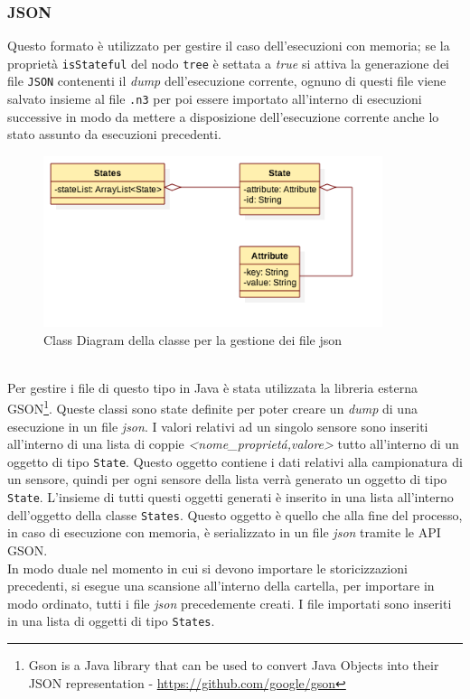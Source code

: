 \documentclass[12pt,a4paper,italian]{article}
\begin{document}
	\subsubsection{JSON} 
	Questo formato è utilizzato per gestire il caso dell'esecuzioni con memoria; se la proprietà \texttt{isStateful} del nodo \texttt{tree} è settata a \emph{true} si attiva la generazione dei file \texttt{JSON} contenenti il \emph{dump} dell'esecuzione corrente, ognuno di questi file viene salvato insieme al file \texttt{.n3} per poi essere importato all'interno di esecuzioni successive in modo da mettere a disposizione dell'esecuzione corrente anche lo stato assunto da esecuzioni precedenti.\\
	\begin{figure}[h!]
		\centering
		\includegraphics[height=5cm]{img/json.png}
		\caption{Class Diagram della classe per la gestione dei file json}\label{jsonClass}
	\end{figure}\\
	Per gestire i file di questo tipo in Java è stata utilizzata la libreria
	esterna GSON\footnote{Gson is a Java library that can be used to convert Java
		Objects into their JSON representation - \url{https://github.com/google/gson}}.
	Queste classi sono state definite per poter creare un \emph{dump} di una
	esecuzione in un file \emph{json}. I valori relativi ad un singolo sensore sono
	inseriti all'interno di una lista di coppie \emph{<nome\_propriet\'a,valore>} tutto
	all'interno di un oggetto di tipo \texttt{State}. Questo oggetto contiene i
	dati relativi alla campionatura di un sensore, quindi per ogni sensore della
	lista verrà generato un oggetto di tipo \texttt{State}. L'insieme di tutti
	questi oggetti generati è inserito in una lista all'interno dell'oggetto della
	classe \texttt{States}. Questo oggetto è quello che alla fine del processo, in
	caso di esecuzione con memoria, è serializzato in un file \emph{json} tramite
	le API GSON.\\
	In modo duale nel momento in cui si devono importare le storicizzazioni
	precedenti, si esegue una scansione all'interno della cartella, per importare
	in modo ordinato, tutti i file \emph{json} precedemente creati. I file
	importati sono inseriti in una lista di oggetti di tipo \texttt{States}.
	
\end{document}
